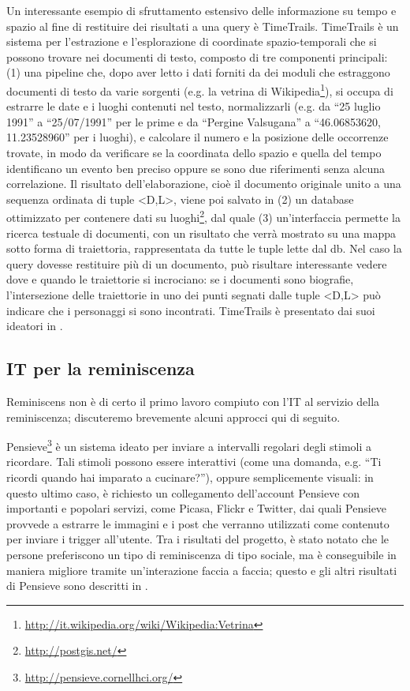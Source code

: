 \documentclass[sigproc-sp.tex]{subfiles}
\begin{document}
Un interessante esempio di sfruttamento estensivo delle informazione su tempo e spazio al fine di restituire dei risultati a una query è TimeTrails. TimeTrails è un sistema per l’estrazione e l’esplorazione di coordinate spazio-temporali che si possono trovare nei documenti di testo, composto di tre componenti principali: (1) una pipeline che, dopo aver letto i dati forniti da dei moduli che estraggono documenti di testo da varie sorgenti (e.g. la vetrina di Wikipedia\footnote{\url{http://it.wikipedia.org/wiki/Wikipedia:Vetrina}}), si occupa di estrarre le date e i luoghi contenuti nel testo, normalizzarli (e.g. da “25 luglio 1991” a “25/07/1991” per le prime e da “Pergine Valsugana” a “46.06853620, 11.23528960” per i luoghi), e calcolare il numero e la posizione delle occorrenze trovate, in modo da verificare se la coordinata dello spazio e quella del tempo identificano un evento ben preciso oppure se sono due riferimenti senza alcuna correlazione. Il risultato dell’elaborazione, cioè il documento originale unito a una sequenza ordinata di tuple <D,L>, viene poi salvato in (2) un database ottimizzato per contenere dati su luoghi\footnote{\url{http://postgis.net/}}, dal quale (3) un’interfaccia permette la ricerca testuale di documenti, con un risultato che verrà mostrato su una mappa sotto forma di traiettoria, rappresentata da tutte le tuple lette dal db. Nel caso la query dovesse restituire più di un documento, può risultare interessante vedere dove e quando le traiettorie si incrociano: se i documenti sono biografie, l’intersezione delle traiettorie in uno dei punti segnati dalle tuple <D,L> può indicare che i personaggi si sono incontrati.
TimeTrails è presentato dai suoi ideatori in \cite{strotgen2010timetrails}.

\subsection{IT per la reminiscenza}
\label{subsec:related}
Reminiscens non è di certo il primo lavoro compiuto con l’IT al servizio della reminiscenza; discuteremo brevemente alcuni approcci qui di seguito.

Pensieve\footnote{\url{http://pensieve.cornellhci.org/}} è un sistema ideato per inviare a intervalli regolari degli stimoli a ricordare. Tali stimoli possono essere interattivi (come una domanda, e.g. “Ti ricordi quando hai imparato a cucinare?”), oppure semplicemente visuali: in questo ultimo caso, è richiesto un collegamento dell’account Pensieve con importanti e popolari servizi, come Picasa, Flickr e Twitter, dai quali Pensieve provvede a estrarre le immagini e i post che verranno utilizzati come contenuto per inviare i trigger all’utente. Tra i risultati del progetto, è stato notato che le persone preferiscono un tipo di reminiscenza di tipo sociale, ma è conseguibile in maniera migliore tramite un'interazione faccia a faccia; questo e gli altri risultati di Pensieve sono descritti in \cite{cosley2012experiences}.
\end{document}
